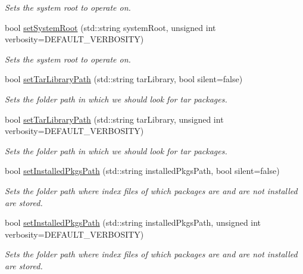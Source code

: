 \begin{DoxyCompactItemize}
\begin{DoxyCompactList}\small\item\em Sets the system root to operate on. \end{DoxyCompactList}\item 
bool \mbox{\hyperlink{classOptions_a8411e1ae670a22eae4252895fa17a34d}{set\+System\+Root}} (std\+::string system\+Root, unsigned int verbosity=D\+E\+F\+A\+U\+L\+T\+\_\+\+V\+E\+R\+B\+O\+S\+I\+TY)
\begin{DoxyCompactList}\small\item\em Sets the system root to operate on. \end{DoxyCompactList}\item 
bool \mbox{\hyperlink{classOptions_a938d840685d739466bfb36759b7fcb43}{set\+Tar\+Library\+Path}} (std\+::string tar\+Library, bool silent=false)
\begin{DoxyCompactList}\small\item\em Sets the folder path in which we should look for tar packages. \end{DoxyCompactList}\item 
bool \mbox{\hyperlink{classOptions_a9444e1e6ec2013938bc4ab92ff5b60ec}{set\+Tar\+Library\+Path}} (std\+::string tar\+Library, unsigned int verbosity=D\+E\+F\+A\+U\+L\+T\+\_\+\+V\+E\+R\+B\+O\+S\+I\+TY)
\begin{DoxyCompactList}\small\item\em Sets the folder path in which we should look for tar packages. \end{DoxyCompactList}\item 
bool \mbox{\hyperlink{classOptions_ad4db404ce1e4e6f07e863423ab1d5c75}{set\+Installed\+Pkgs\+Path}} (std\+::string installed\+Pkgs\+Path, bool silent=false)
\begin{DoxyCompactList}\small\item\em Sets the folder path where index files of which packages are and are not installed are stored. \end{DoxyCompactList}\item 
bool \mbox{\hyperlink{classOptions_acd4bb01ae1876bf7cc2bfdb0743ba668}{set\+Installed\+Pkgs\+Path}} (std\+::string installed\+Pkgs\+Path, unsigned int verbosity=D\+E\+F\+A\+U\+L\+T\+\_\+\+V\+E\+R\+B\+O\+S\+I\+TY)
\begin{DoxyCompactList}\small\item\em Sets the folder path where index files of which packages are and are not installed are stored. \end{DoxyCompactList}\item 

\end{DoxyCompactItemize}
